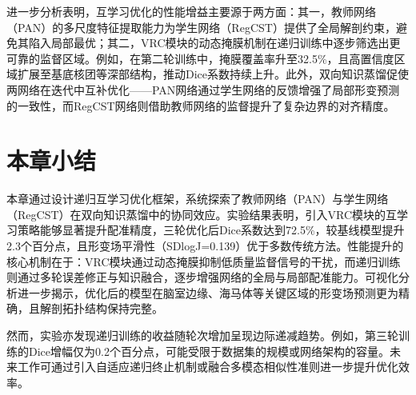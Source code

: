 进一步分析表明，互学习优化的性能增益主要源于两方面：其一，教师网络（PAN）的多尺度特征提取能力为学生网络（RegCST）提供了全局解剖约束，避免其陷入局部最优；其二，VRC模块的动态掩膜机制在递归训练中逐步筛选出更可靠的监督区域。例如，在第二轮训练中，掩膜覆盖率升至32.5\%，且高置信度区域扩展至基底核团等深部结构，推动Dice系数持续上升。此外，双向知识蒸馏促使两网络在迭代中互补优化——PAN网络通过学生网络的反馈增强了局部形变预测的一致性，而RegCST网络则借助教师网络的监督提升了复杂边界的对齐精度。

\section{本章小结}

本章通过设计递归互学习优化框架，系统探索了教师网络（PAN）与学生网络（RegCST）在双向知识蒸馏中的协同效应。实验结果表明，引入VRC模块的互学习策略能够显著提升配准精度，三轮优化后Dice系数达到72.5\%，较基线模型提升2.3个百分点，且形变场平滑性（SDlogJ=0.139）优于多数传统方法。性能提升的核心机制在于：VRC模块通过动态掩膜抑制低质量监督信号的干扰，而递归训练则通过多轮误差修正与知识融合，逐步增强网络的全局与局部配准能力。可视化分析进一步揭示，优化后的模型在脑室边缘、海马体等关键区域的形变场预测更为精确，且解剖拓扑结构保持完整。

然而，实验亦发现递归训练的收益随轮次增加呈现边际递减趋势。例如，第三轮训练的Dice增幅仅为0.2个百分点，可能受限于数据集的规模或网络架构的容量。未来工作可通过引入自适应递归终止机制或融合多模态相似性准则进一步提升优化效率。